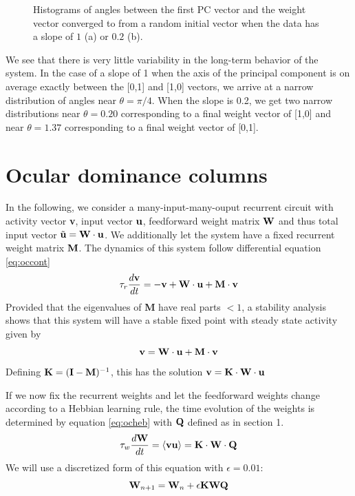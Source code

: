 \documentclass{article}
\begin{document}
\begin{figure}[h]
\begin{subfigure}[t]{0.30\linewidth}
		\subcaption{}
		\label{}	
	\end{subfigure}%
\caption{Histograms of angles between the first PC vector and  the weight vector converged to from a random initial vector when the data has a slope of $1$ (a) or $0.2$ (b).}
\label{fig:thetas}
\end{figure}

We see that there is very little variability in the long-term behavior of the system. In the case of a slope of 1 when the axis of the principal component is on average exactly between the [0,1] and [1,0] vectors, we arrive at a narrow distribution of angles near $\theta = \pi / 4$. When the slope is 0.2, we get two narrow distributions near $\theta = 0.20$ corresponding to a final weight vector of [1,0] and near $\theta = 1.37$ corresponding to a final weight vector of [0,1].

\section{Ocular dominance columns}

In the following, we consider a many-input-many-ouput recurrent circuit with activity vector \textbf{v}, input vector $\bf u$, feedforward weight matrix $\bf W$ and thus total input vector $\tilde {\bf u} = {\bf W \cdot u}$. We additionally let the system have a fixed recurrent weight matrix $\bf M$. The dynamics of this system follow differential equation \ref{eq:occont}
\begin{equation}\label{eq:occont}
\tau_r \dfrac{d \bf v}{dt} = -{\bf v} + {\bf W \cdot u} + {\bf M\cdot v}
\end{equation}
Provided that the eigenvalues of \textbf{M} have real parts $<1$, a stability analysis shows that this system will have a stable fixed point with steady state activity given by 
\begin{equation}
{\bf v} = {\bf W \cdot u} + {\bf M \cdot v}
\end{equation}
Defining ${\bf K} = ({\bf I} - {\bf M})^{-1}$, this has the solution
$
{\bf v} = {\bf K \cdot W \cdot u}
$

If we now fix the recurrent weights and let the feedforward weights change according to a Hebbian learning rule, the time evolution of the weights is determined by equation \ref{eq:ocheb} with $\bf Q$ defined as in section 1.
\begin{equation}\label{eq:ocheb}
\tau_w \dfrac{d{\bf W}}{dt} = \braket{\bf vu} = {\bf K \cdot W \cdot Q}
\end{equation}
We will use a discretized form of this equation with $\epsilon = 0.01$:
\begin{equation}\label{eq:ocdic}
{\bf W}_{n+1} = {\bf W}_n + \epsilon \bf K W Q
\end{equation}
\end{document}
